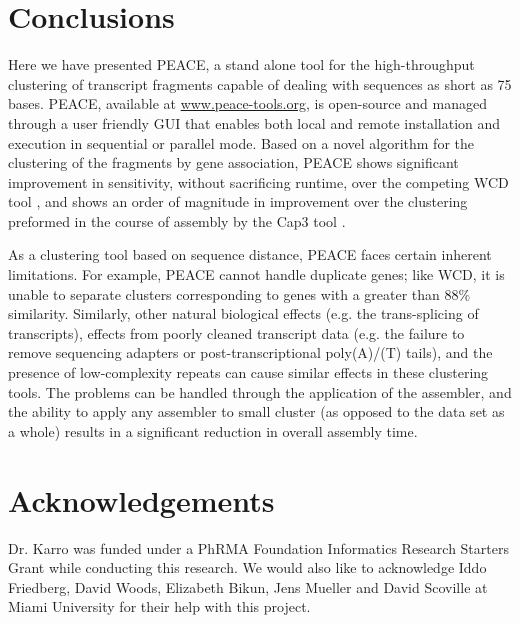 \documentclass[a4,center,fleqn]{NAR}
\newcommand{\peace} {{\small PEACE}}
\newcommand{\wcd} {{\small WCD}}
\newcommand{\capthree} {{\small Cap3}}
\begin{document}
\section{Conclusions}

Here we have presented \peace, a stand alone tool for the
high-throughput clustering of transcript fragments capable of dealing
with sequences as short as 75 bases.  \peace\/, available at
\href{http://www.peace-tools.org}{www.peace-tools.org}, is open-source
and managed through a user friendly GUI that enables both local and
remote installation and execution in sequential or parallel mode.
Based on a novel algorithm for the clustering of the fragments by gene
association, \peace\/ shows significant improvement in sensitivity,
without sacrificing runtime, over the competing \wcd\/ tool
\cite{Hazelhurst08a}, and shows an order of magnitude in improvement
over the clustering preformed in the course of assembly by the
\capthree\/ tool \cite{Huang99}.

As a clustering tool based on sequence distance, \peace\/ faces
certain inherent limitations. For example, \peace\/ cannot handle
duplicate genes; like \wcd\/, it is unable to separate clusters
corresponding to genes with a greater than 88\% similarity.
Similarly, other natural biological effects (e.g. the trans-splicing of
transcripts), effects from poorly cleaned transcript data (e.g. the
failure to remove sequencing adapters or post-transcriptional
poly(A)/(T) tails), and the presence of low-complexity repeats can
cause similar effects in these clustering tools.  The problems can be
handled through the application of the assembler, and the ability to
apply any assembler to small cluster (as opposed to the data set as a
whole) results in a significant reduction in overall assembly time.

\section{Acknowledgements}

Dr. Karro was funded under a PhRMA Foundation Informatics Research
Starters Grant while conducting this research.  We would also like to
acknowledge Iddo Friedberg, David Woods, Elizabeth Bikun, Jens Mueller and David
Scoville at Miami University for their help with this project.

\vspace{3mm}


\end{document}
